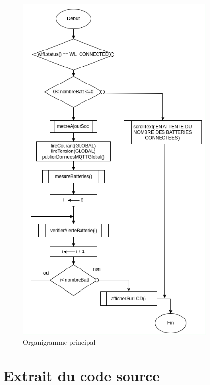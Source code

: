 \begin{figure}[H]
	\centering
\includegraphics[width=10cm]{./img/organigramme/principale1.png}
\caption{Organigramme principal}
\label{fig:organigramme_principal}
\end{figure}

\section*{Extrait du code source}

